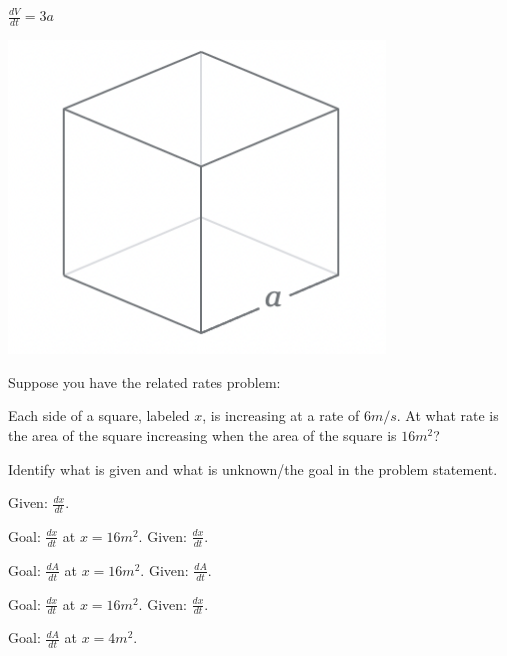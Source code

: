 \documentclass[addpoints, 12pt]{exam}%
\newcommand{\spc}{\vspace*{0.5cm}}
\begin{document}
\begin{questions}
\begin{minipage}{0.5\textwidth}
\begin{multicols}{2}
\begin{choices}
\choice $\frac{dV}{dt} = 3a$\vspace*{10pt}
\end{choices}
\end{multicols}
\end{minipage}
\hspace*{1cm}
\begin{minipage}{0.45\textwidth}
\includegraphics[width=0.75\textwidth]{HW7-cube.png}
\end{minipage}

\spc

\question[1]

Suppose you have the related rates problem: 

Each side of a square, labeled $x$, is increasing at a rate of $6m/s$. At what rate is the area of the square increasing when the area of the square is $16m^2$?

Identify what is given and what is unknown/the goal in the problem statement.

\begin{multicols}{2}
\begin{choices}
\choice Given: $\frac{dx}{dt}$.

Goal: $\frac{dx}{dt}$ at $x = 16 m^2$.
\choice Given: $\frac{dx}{dt}$.

Goal: $\frac{dA}{dt}$ at $x = 16 m^2$.
\choice Given: $\frac{dA}{dt}$.

Goal: $\frac{dx}{dt}$ at $x = 16 m^2$.
\CorrectChoice Given: $\frac{dx}{dt}$.

Goal: $\frac{dA}{dt}$ at $x = 4 m^2$.
\end{choices}
\end{multicols}

\newpage

\question[1]


\end{questions}
\end{document}
